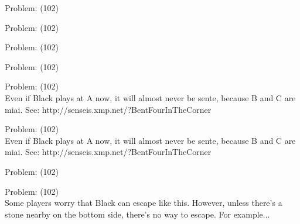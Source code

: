 \documentclass[11pt]{article}
\begin{document}
\begin{minipage}[t]{0.5\textwidth}
  {\centering
  
Problem: (102)\\
  }
\end{minipage}
\begin{minipage}[t]{0.5\textwidth}
  {\centering
  
Problem: (102)\\
  }
\end{minipage}
\begin{minipage}[t]{0.5\textwidth}
  {\centering
  
Problem: (102)\\
  }
\end{minipage}
\begin{minipage}[t]{0.5\textwidth}
  {\centering
  
Problem: (102)\\
  }
\end{minipage}
\begin{minipage}[t]{0.5\textwidth}
  {\centering
  
Problem: (102)\\
Even if Black plays at A now, it will almost never be sente, because B and C are miai. See: http://senseis.xmp.net/?BentFourInTheCorner\\
  }
\end{minipage}
\begin{minipage}[t]{0.5\textwidth}
  {\centering
  
Problem: (102)\\
Even if Black plays at A now, it will almost never be sente, because B and C are miai. See: http://senseis.xmp.net/?BentFourInTheCorner\\
  }
\end{minipage}
\begin{minipage}[t]{0.5\textwidth}
  {\centering
  
Problem: (102)\\
  }
\end{minipage}
\begin{minipage}[t]{0.5\textwidth}
  {\centering
  
Problem: (102)\\
Some players worry that Black can escape like this. However, unless there's a stone nearby on the bottom side, there's no way to escape. For example...\\
  }
\end{minipage}
\end{document}
